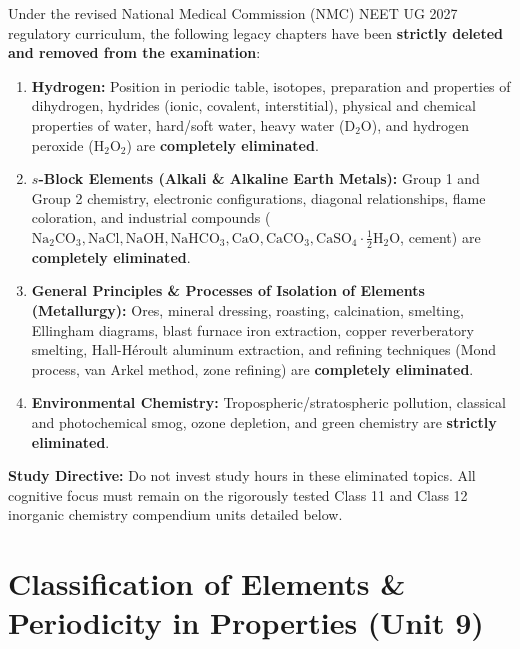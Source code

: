 \documentclass[10pt,twoside,openright]{book}
\begin{document}
\begin{trapbox}
Under the revised National Medical Commission (NMC) NEET UG 2027 regulatory curriculum, the following legacy chapters have been \textbf{strictly deleted and removed from the examination}:
\begin{enumerate}
  \item \textbf{Hydrogen:} Position in periodic table, isotopes, preparation and properties of dihydrogen, hydrides (ionic, covalent, interstitial), physical and chemical properties of water, hard/soft water, heavy water ($\mathrm{D_2O}$), and hydrogen peroxide ($\mathrm{H_2O_2}$) are \textbf{completely eliminated}.
  \item \textbf{$s$-Block Elements (Alkali \& Alkaline Earth Metals):} Group 1 and Group 2 chemistry, electronic configurations, diagonal relationships, flame coloration, and industrial compounds ($\mathrm{Na_2CO_3, NaCl, NaOH, NaHCO_3, CaO, CaCO_3, CaSO_4\cdot \frac{1}{2}H_2O}$, cement) are \textbf{completely eliminated}.
  \item \textbf{General Principles \& Processes of Isolation of Elements (Metallurgy):} Ores, mineral dressing, roasting, calcination, smelting, Ellingham diagrams, blast furnace iron extraction, copper reverberatory smelting, Hall-Héroult aluminum extraction, and refining techniques (Mond process, van Arkel method, zone refining) are \textbf{completely eliminated}.
  \item \textbf{Environmental Chemistry:} Tropospheric/stratospheric pollution, classical and photochemical smog, ozone depletion, and green chemistry are \textbf{strictly eliminated}.
\end{enumerate}
\textbf{Study Directive:} Do not invest study hours in these eliminated topics. All cognitive focus must remain on the rigorously tested Class 11 and Class 12 inorganic chemistry compendium units detailed below.
\end{trapbox}

\section{Classification of Elements \& Periodicity in Properties (Unit 9)}
\end{document}
